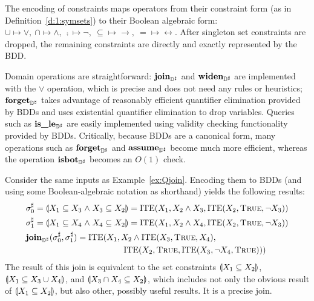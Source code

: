 The encoding of constraints maps operators from their constraint form (as in Definition~\ref{d:1:symsets}) to their Boolean algebraic form: $\cup \mapsto \vee, \ \cap \mapsto \wedge, \ \comp{} \mapsto \neg, \ \subseteq \mapsto \rightarrow, \ = \mapsto \leftrightarrow$. After singleton set constraints are dropped, the remaining constraints are directly and exactly represented by the BDD.  

Domain operations are straightforward: $\textbf{join}_{{\mathbb{D}}^{\sharp}}$ and $\textbf{widen}_{{\mathbb{D}}^{\sharp}}$ are implemented with the $\vee$ operation, which is precise and does not need any rules or heuristics; $\textbf{forget}_{{\mathbb{D}}^{\sharp}}$ takes advantage of reasonably efficient quantifier elimination provided by BDDs and uses existential quantifier elimination to drop variables.  Queries such as $\textbf{is\_le}_{{\mathbb{D}}^{\sharp}}$ are easily implemented using validity checking functionality provided by BDDs.  Critically, because BDDs are a canonical form, many operations such as $\textbf{forget}_{{\mathbb{D}}^{\sharp}}$ and $\textbf{assume}_{{\mathbb{D}}^{\sharp}}$ become much more efficient, whereas the operation $\textbf{isbot}_{{\mathbb{D}}^{\sharp}}$ becomes an $O(1)$ check.

\begin{example}  Consider the same inputs as Example~\ref{ex:Qjoin}.  Encoding them to BDDs (and using some Boolean-algebraic notation as shorthand) yields the following results:
\begin{align*}
  & {\sigma}^{\sharp}_0 = \llparenthesis X_1 \subseteq X_3 \mathrel{\wedge} X_3 \subseteq X_2 \rrparenthesis = \textrm{ITE}(X_1, X_2 \wedge X_3, \textrm{ITE}(X_2, \textsc{True}, \neg X_3)) \\
  & {\sigma}^{\sharp}_1 = \llparenthesis X_1 \subseteq X_4 \mathrel{\wedge} X_4 \subseteq X_2 \rrparenthesis = \textrm{ITE}(X_1, X_2 \wedge X_4, \textrm{ITE}(X_2, \textsc{True}, \neg X_3)) \\
  & \textbf{join}_{{\mathbb{D}}^{\sharp}}({\sigma}^{\sharp}_0, {\sigma}^{\sharp}_1 ) = \textrm{ITE}(X_1, X_2 \wedge \textrm{ITE}(X_3, \textsc{True}, X_4), \\
  & \qquad \qquad \qquad \qquad \qquad \quad \;\; \textrm{ITE}(X_2, \textsc{True}, \textrm{ITE}(X_3, \neg X_4, \textsc{True})))
\end{align*}
  The result of this join is equivalent to the set constraints $\llparenthesis X_1 \subseteq X_2 \rrparenthesis$, $\llparenthesis X_1 \subseteq X_3 \cup X_4 \rrparenthesis$, and $\llparenthesis X_3 \cap X_4 \subseteq X_2 \rrparenthesis$, which includes not only the obvious result of $\llparenthesis X_1 \subseteq X_2 \rrparenthesis$, but also other, possibly useful results.  It is a precise join.
\end{example}

